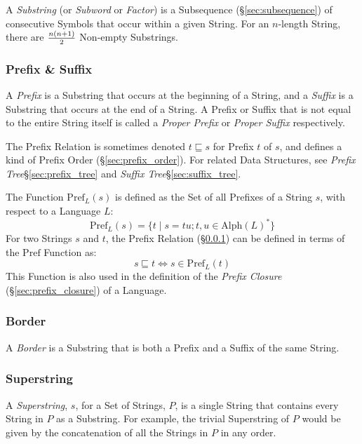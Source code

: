 A \emph{Substring} (or \emph{Subword} or \emph{Factor}) is a
Subsequence (\S\ref{sec:subsequence}) of consecutive Symbols that
occur within a given String. For an $n$-length String, there are
$n(n+1) \over 2$ Non-empty Substrings.



\subsubsection{Prefix \& Suffix}\label{sec:prefix_suffix}

A \emph{Prefix} is a Substring that occurs at the beginning of a
String, and a \emph{Suffix} is a Substring that occurs at the end of a
String. A Prefix or Suffix that is not equal to the entire String
itself is called a \emph{Proper Prefix} or \emph{Proper Suffix}
respectively.

The Prefix Relation is sometimes denoted $t \sqsubseteq s$ for Prefix
$t$ of $s$, and defines a kind of Prefix Order
(\S\ref{sec:prefix_order}). For related Data Structures, see
\emph{Prefix Tree}\S\ref{sec:prefix_tree} and \emph{Suffix
  Tree}\S\ref{sec:suffix_tree}.

The Function $\mathrm{Pref}_L(s)$ is defined as the Set of all
Prefixes of a String $s$, with respect to a Language $L$:
\[
  \mathrm{Pref}_L(s) =
    \{ t\;|\;s = tu; t,u \in \mathrm{Alph}(L)^* \}
\]
For two Strings $s$ and $t$, the Prefix Relation
(\S\ref{sec:prefix_suffix}) can be defined in terms of the
$\mathrm{Pref}$ Function as:
\[
  s \sqsubseteq t \Leftrightarrow s \in \mathrm{Pref}_L(t)
\]
This Function is also used in the definition of the \emph{Prefix
  Closure} (\S\ref{sec:prefix_closure}) of a Language.



\subsubsection{Border}\label{sec:string_border}

A \emph{Border} is a Substring that is both a Prefix and a Suffix of
the same String.



\subsubsection{Superstring}\label{sec:superstring}

A \emph{Superstring}, $s$, for a Set of Strings, $P$, is a single
String that contains every String in $P$ as a Substring. For example,
the trivial Superstring of $P$ would be given by the concatenation of
all the Strings in $P$ in any order.



